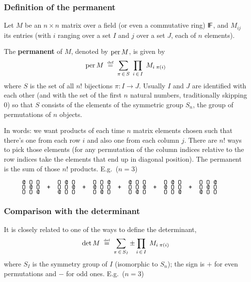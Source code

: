\documentclass[12pt]{article}
\let\S\scriptstyle
\let\SS\scriptscriptstyle
\def\sfmath#1{{\mathchoice%
{{\sf #1}}{{\sf #1}}{{\S\sf #1}}{{\SS\sf #1}}}}
\def\Stalkset#1{\sfmath{I\kern-.12em#1}}
\def\Fset{\Stalkset F}
\def\isdef{\mathrel{\mathop{=}\limits^{\smash{\hbox{\tiny def}}}}}
\begin{document}
\def\per{\mathop{\rm per}\nolimits}


\subsubsection*{Definition of the permanent}

Let $M$ be an $n\times n$ matrix over a field (or even a commutative ring)
$\Fset$, and $M_{ij}$ its entries (with $i$ ranging over a set $I$ and $j$ 
over a set $J$, each of $n$ elements).

The {\bf permanent} of $M$, denoted by $\per M$, is given by
$$
  \per M \;\isdef\; 
  \sum_{\pi\,\in\,S} \; \prod_{i\,\in\,I} \; M_{i\;\pi(i)}
$$
where $S$ is the set of all $n!$ bijections $\pi : I\to J$. Usually $I$ and $J$ are identified with each other (and with the set of the first $n$ natural numbers, traditionally skipping 0) so that $S$ consists of the elements of the symmetric group $S_n$, the group of permutations of $n$ objects.

In words: we want products of each time $n$ matrix elements chosen
such that there's one from each row $i$ and also one from each column $j$.
There are $n!$ ways to pick those elements (for any permutation of the
column indices relative to the row indices take the elements that end
up in diagonal position). The permanent is the sum of those $n!$ products.
E.g.\ ($n=3$)

$\hbox{\verb"     @ O O     O @ O     O O @     @ O O     O @ O     O O @"}$\\
$\hbox{\verb"     O @ O  +  O O @  +  @ O O  +  O O @  +  @ O O  +  O @ O"}$\\
$\hbox{\verb"     O O @     @ O O     O @ O     O @ O     O O @     @ O O"}$

\clearpage
\subsubsection*{Comparison with the determinant}

It is closely related to one of the ways to define the determinant,
$$
  \det M \;\isdef\; 
  \sum_{\pi\,\in\,S_I} \pm \prod_{i\,\in\,I} \; M_{i\;\pi(i)}
$$
where $S_I$ is the symmetry group of $I$ (isomorphic to $S_n$); the sign is $+$ for even permutations and $-$ for odd ones.
E.g.\ ($n=3$)
\end{document}
